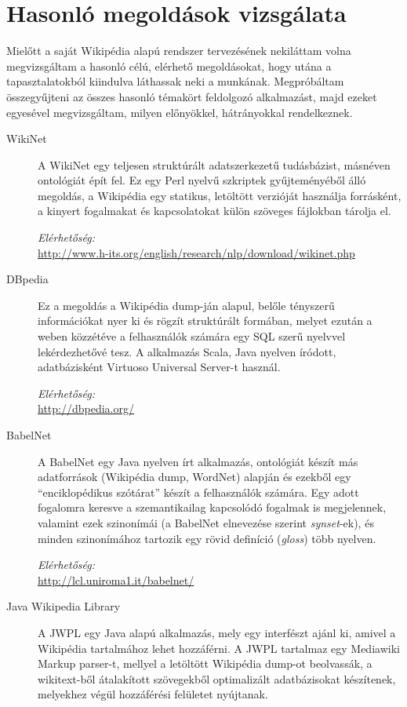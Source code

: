 \chapter{Hasonló megoldások vizsgálata}
\label{cha:related_work}

Mielőtt a saját Wikipédia alapú rendszer tervezésének nekiláttam volna megvizsgáltam a hasonló célú, elérhető megoldásokat, hogy utána a tapasztalatokból kiindulva láthassak neki a munkának. Megpróbáltam összegyűjteni az összes hasonló témakört feldolgozó alkalmazást, majd ezeket egyesével megvizsgáltam, milyen előnyökkel, hátrányokkal rendelkeznek.

\begin{description}
	\item[WikiNet\cite{wikinet}] A WikiNet egy teljesen struktúrált adatszerkezetű tudásbázist, másnéven ontológiát épít fel. Ez egy Perl nyelvű szkriptek gyűjteményéből álló megoldás, a Wikipédia egy statikus, letöltött verzióját használja forrásként, a kinyert fogalmakat és kapcsolatokat külön szöveges fájlokban tárolja el.
	
\textit{Elérhetőség:}\\
\url{http://www.h-its.org/english/research/nlp/download/wikinet.php}

	\item[DBpedia] Ez a megoldás a Wikipédia dump-ján alapul, belőle tényszerű információkat nyer ki és rögzít struktúrált formában, melyet ezután a weben közzétéve a felhasználók számára egy SQL szerű nyelvvel lekérdezhetővé tesz. A alkalmazás Scala, Java nyelven íródott, adatbázisként Virtuoso Universal Server-t használ.
	
\textit{Elérhetőség:}\\
\url{http://dbpedia.org/}

\item[BabelNet\cite{babelnet}] A BabelNet egy Java nyelven írt alkalmazás, ontológiát készít más adatforrások (Wikipédia dump, WordNet) alapján és ezekből egy ``enciklopédikus szótárat'' készít a felhasználók számára. Egy adott fogalomra keresve a szemantikailag kapcsolódó fogalmak is megjelennek, valamint ezek szinonímái (a BabelNet elnevezése szerint \textit{synset}-ek), és minden szinonímához tartozik egy rövid definíció (\textit{gloss}) több nyelven.
	
\textit{Elérhetőség:}\\
\url{http://lcl.uniroma1.it/babelnet/}

\item[Java Wikipedia Library\cite{jwpl}] A JWPL egy Java alapú alkalmazás, mely egy interfészt ajánl ki, amivel a Wikipédia tartalmához lehet hozzáférni. A JWPL tartalmaz egy Mediawiki Markup parser-t, mellyel a letöltött Wikipédia dump-ot beolvassák, a wikitext-ből átalakított szövegekből optimalizált adatbázisokat készítenek, melyekhez végül hozzáférési felületet nyújtanak.
	

\end{description}
